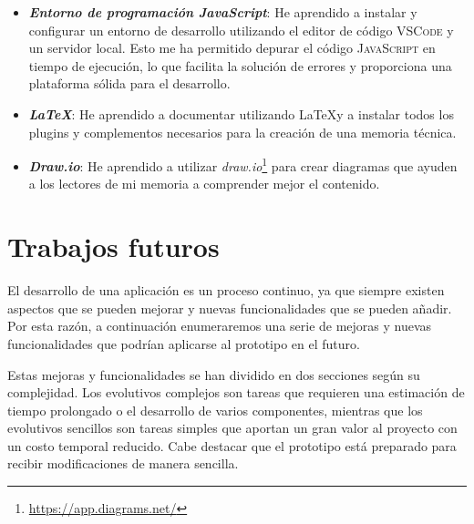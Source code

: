 \documentclass[a4paper, 11pt]{book}
\begin{document}
\begin{itemize}
	\item \textbf{\emph{Entorno de programación JavaScript}}: He aprendido a instalar y configurar un entorno de desarrollo utilizando el editor de código \textsc{VSCode} y un servidor local. Esto me ha permitido depurar el código \textsc{JavaScript} en tiempo de ejecución, lo que facilita la solución de errores y proporciona una plataforma sólida para el desarrollo.
	\item \textbf{\emph{\LaTeX}}: He aprendido a documentar utilizando \LaTeX y a instalar todos los plugins y complementos necesarios para la creación de una memoria técnica.
	\item \textbf{\emph{Draw.io}}: He aprendido a utilizar \emph{draw.io}\footnote{\url{https://app.diagrams.net/}} para crear diagramas que ayuden a los lectores de mi memoria a comprender mejor el contenido.
\end{itemize}
\section{Trabajos futuros}
\label{sec:trabajos_futuros}
El desarrollo de una aplicación es un proceso continuo, ya que siempre existen aspectos que se pueden mejorar y nuevas funcionalidades que se pueden añadir. Por esta razón, a continuación enumeraremos una serie de mejoras y nuevas funcionalidades que podrían aplicarse al prototipo en el futuro.

Estas mejoras y funcionalidades se han dividido en dos secciones según su complejidad. Los evolutivos complejos son tareas que requieren una estimación de tiempo prolongado o el desarrollo de varios componentes, mientras que los evolutivos sencillos son tareas simples que aportan un gran valor al proyecto con un costo temporal reducido. Cabe destacar que el prototipo está preparado para recibir modificaciones de manera sencilla.
\end{document}
